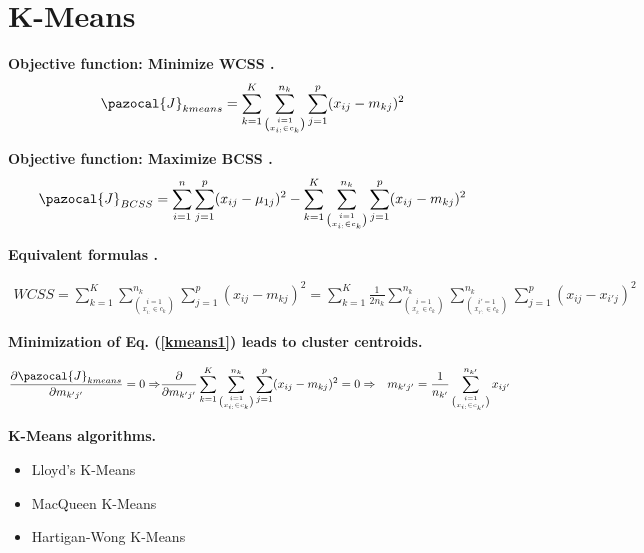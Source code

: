 \documentclass[12pt]{article}
\renewcommand\cite{\citep}  %
\newcommand{\CJ}{\pazocal{J}}
\begin{document}
\cleardoublepage

\section{K-Means}

\noindent \textbf{Objective function: Minimize WCSS \cite{jain2010data}.}
\begin{align}\label{kmeans1}
\CJ_{kmeans} &= \sum_{k=1}^{K}\sum_{\binom{i=1}{x_{i:} \in c_k}}^{n_k} \sum_{j=1}^{p} (x_{ij}-m_{kj})^2	
\end{align}	

\noindent \textbf{Objective function: Maximize BCSS \cite{witten2010framework}.}
\begin{align}\label{kmeans2}
\CJ_{BCSS} &= \sum_{i=1}^{n}\sum_{j=1}^{p}(x_{ij}-{\mu}_{1j})^2 - \sum_{k=1}^{K}\sum_{\binom{i=1}{x_{i:} \in c_k}}^{n_k}\sum_{j=1}^{p}(x_{ij}-m_{kj})^2	
\end{align}	

\noindent \textbf{Equivalent formulas \cite{witten2010framework}.}

\begin{align}\label{prrof1a}
WCSS = 
\sum_{k=1}^{K} \sum_{\binom{i=1}{x_{i:} \in c_k}}^{n_k} \sum_{j=1}^{p} (x_{ij}-m_{kj})^2	
= \sum_{k=1}^{K} \frac{1}{2n_k}\sum_{\binom{i=1}{x_{i:} \in c_k}}^{n_k} \sum_{\binom{i'=1}{x_{i':} \in c_k}}^{n_k} \sum_{j=1}^{p} (x_{ij}-x_{i'j})^2
\end{align}	

\noindent \textbf{Minimization of Eq. (\ref{kmeans1}) leads to cluster centroids.}

\begin{align}
\frac{\partial \CJ_{kmeans}}{\partial m_{k'j'}} = 0 \Rightarrow 
&\frac{\partial}{\partial m_{k'j'}} \sum_{k=1}^{K}\sum_{\binom{i=1}{x_{i:} \in c_k}}^{n_k} \sum_{j=1}^{p} (x_{ij}-m_{kj})^2 = 0 \Rightarrow 
&m_{k'j'} = \frac{1}{n_{k'}}\sum_{\binom{i=1}{x_{i:} \in c_{k'}}}^{n_{k'}} x_{ij'}
\end{align}

\noindent\textbf{K-Means algorithms.}
\begin{itemize}
	\item Lloyd's K-Means \cite{lloyd1982least, jain2010data}
	\item MacQueen K-Means \cite{macqueen1967some}
	\item Hartigan-Wong K-Means \cite{hartigan1979algorithm,slonim2013hartigan}
\end{itemize}
\end{document}
